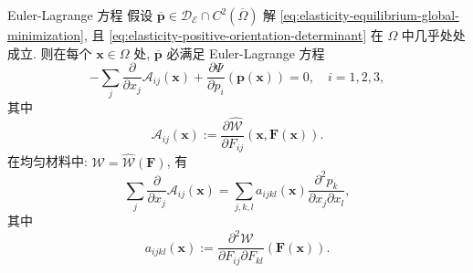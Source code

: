 \begin{Theorem}{Euler-Lagrange 方程}
\label{thm:elasticity-euler-lagrange-equations}
假设 $\overline{\bm{p}}\in\mathcal{D}_{\mathcal{E}}\cap C^2(\overline\Omega)$ 解 \eqref{eq:elasticity-equilibrium-global-minimization}, 且 \eqref{eq:elasticity-positive-orientation-determinant} 在 $\Omega$ 中几乎处处成立. 则在每个 $\bm{x}\in\Omega$ 处, $\overline{\bm{p}}$ 必满足 Euler-Lagrange 方程
\begin{equation}\label{eq:elasticity-euler-lagrange-equations}
-\sum_j\dfrac{\partial}{\partial x_j}\mathcal{A}_{ij}(\bm{x})+\dfrac{\partial\Psi}{\partial p_i}(\bm{p}(\bm{x}))=0,\quad i=1,2,3,
\end{equation}
其中
\begin{equation}\label{eq:elasticity-euler-lagrange-stress-coefficients}
\mathcal{A}_{ij}(\bm{x}):=\dfrac{\partial\widehat{\mathcal{W}}}{\partial F_{ij}}(\bm{x},\bm{F}(\bm{x})).
\end{equation}
在均匀材料中: $\mathcal{W}=\widehat{\mathcal{W}}(\bm{F})$, 有
\begin{equation}\label{eq:elasticity-homogeneous-stress-divergence}
\sum_j\dfrac{\partial}{\partial x_j}\mathcal{A}_{ij}(\bm{x})=\sum_{j,k,l}a_{ijkl}(\bm{x})\dfrac{\partial^2p_k}{\partial x_j\partial x_l},
\end{equation}
其中
\begin{equation}\label{eq:elasticity-homogeneous-second-derivative-coefficients}
a_{ijkl}(\bm{x}):=\dfrac{\partial^2\mathcal{W}}{\partial F_{ij}\partial F_{kl}}(\bm{F}(\bm{x})).
\end{equation}

\end{Theorem}

